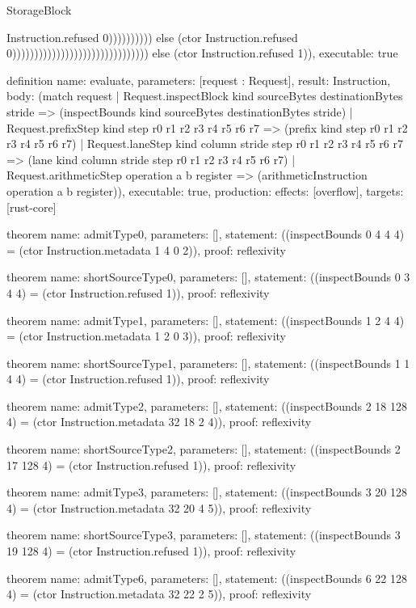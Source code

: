 \begin{lexlean}{StorageBlock}
\begin{semanticmodule}
{Instruction.refused 0)))))))))) else (ctor Instruction.refused 0))))))))))))))))))))))))))))))) else (ctor Instruction.refused 1)),
  executable: true
}

definition{
  name: evaluate,
  parameters: [request : Request],
  result: Instruction,
  body: (match request
    | Request.inspectBlock kind sourceBytes destinationBytes stride => (inspectBounds kind sourceBytes destinationBytes stride)
    | Request.prefixStep kind step r0 r1 r2 r3 r4 r5 r6 r7 => (prefix kind step r0 r1 r2 r3 r4 r5 r6 r7)
    | Request.laneStep kind column stride step r0 r1 r2 r3 r4 r5 r6 r7 => (lane kind column stride step r0 r1 r2 r3 r4 r5 r6 r7)
    | Request.arithmeticStep operation a b register => (arithmeticInstruction operation a b register)),
  executable: true,
  production: {effects: [overflow], targets: [rust-core]}
}

theorem{
  name: admitType0,
  parameters: [],
  statement: ((inspectBounds 0 4 4 4) = (ctor Instruction.metadata 1 4 0 2)),
  proof: reflexivity{}
}

theorem{
  name: shortSourceType0,
  parameters: [],
  statement: ((inspectBounds 0 3 4 4) = (ctor Instruction.refused 1)),
  proof: reflexivity{}
}

theorem{
  name: admitType1,
  parameters: [],
  statement: ((inspectBounds 1 2 4 4) = (ctor Instruction.metadata 1 2 0 3)),
  proof: reflexivity{}
}

theorem{
  name: shortSourceType1,
  parameters: [],
  statement: ((inspectBounds 1 1 4 4) = (ctor Instruction.refused 1)),
  proof: reflexivity{}
}

theorem{
  name: admitType2,
  parameters: [],
  statement: ((inspectBounds 2 18 128 4) = (ctor Instruction.metadata 32 18 2 4)),
  proof: reflexivity{}
}

theorem{
  name: shortSourceType2,
  parameters: [],
  statement: ((inspectBounds 2 17 128 4) = (ctor Instruction.refused 1)),
  proof: reflexivity{}
}

theorem{
  name: admitType3,
  parameters: [],
  statement: ((inspectBounds 3 20 128 4) = (ctor Instruction.metadata 32 20 4 5)),
  proof: reflexivity{}
}

theorem{
  name: shortSourceType3,
  parameters: [],
  statement: ((inspectBounds 3 19 128 4) = (ctor Instruction.refused 1)),
  proof: reflexivity{}
}

theorem{
  name: admitType6,
  parameters: [],
  statement: ((inspectBounds 6 22 128 4) = (ctor Instruction.metadata 32 22 2 5)),
  proof: reflexivity{}
}


\end{semanticmodule}
\end{lexlean}
